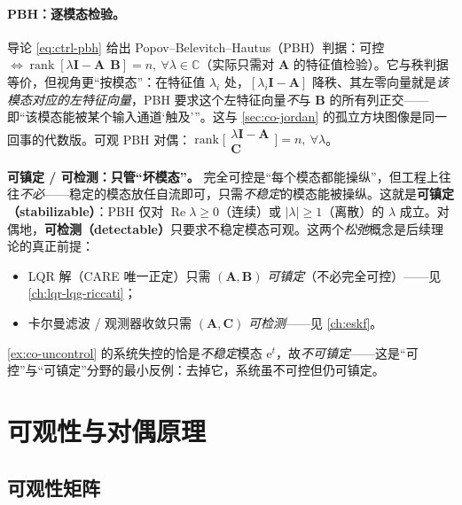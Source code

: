 \paragraph{PBH：逐模态检验。}
导论 \cref{eq:ctrl-pbh} 给出 Popov--Belevitch--Hautus（PBH）判据：可控 $\iff\operatorname{rank}[\lambda\mathbf{I}-\mathbf{A}\ \ \mathbf{B}]=n,\ \forall\lambda\in\mathbb{C}$（实际只需对 $\mathbf{A}$ 的特征值检验）。它与秩判据等价，但视角更“按模态”：在特征值 $\lambda_i$ 处，$[\lambda_i\mathbf{I}-\mathbf{A}]$ 降秩、其左零向量就是\emph{该模态对应的左特征向量}，PBH 要求这个左特征向量\emph{不}与 $\mathbf{B}$ 的所有列正交——即“该模态能被某个输入通道‘触及’”。这与 \cref{sec:co-jordan} 的孤立方块图像是同一回事的代数版。可观 PBH 对偶：$\operatorname{rank}\big[\begin{smallmatrix}\lambda\mathbf{I}-\mathbf{A}\\ \mathbf{C}\end{smallmatrix}\big]=n,\ \forall\lambda$。

\begin{insight}
\textbf{可镇定 / 可检测：只管“坏模态”。}\;
完全可控是“每个模态都能操纵”，但工程上往往\emph{不必}——稳定的模态放任自流即可，只需\emph{不稳定}的模态能被操纵。这就是\textbf{可镇定（stabilizable）}：PBH 仅对 $\operatorname{Re}\lambda\ge0$（连续）或 $|\lambda|\ge1$（离散）的 $\lambda$ 成立。对偶地，\textbf{可检测（detectable）}只要求不稳定模态可观。这两个\emph{松弛}概念是后续理论的真正前提：
\begin{itemize}
  \item LQR 解（CARE 唯一正定）只需 $(\mathbf{A},\mathbf{B})$ \emph{可镇定}（不必完全可控）——见 \cref{ch:lqr-lqg-riccati}；
  \item 卡尔曼滤波 / 观测器收敛只需 $(\mathbf{A},\mathbf{C})$ \emph{可检测}——见 \cref{ch:eskf}。
\end{itemize}
\cref{ex:co-uncontrol} 的系统失控的恰是\emph{不稳定}模态 $\mathrm{e}^t$，故\emph{不可镇定}——这是“可控”与“可镇定”分野的最小反例：去掉它，系统虽不可控但仍可镇定。
\end{insight}

\section{可观性与对偶原理}
\label{sec:co-observe}

\subsection{可观性矩阵}
\label{sec:co-omat}

